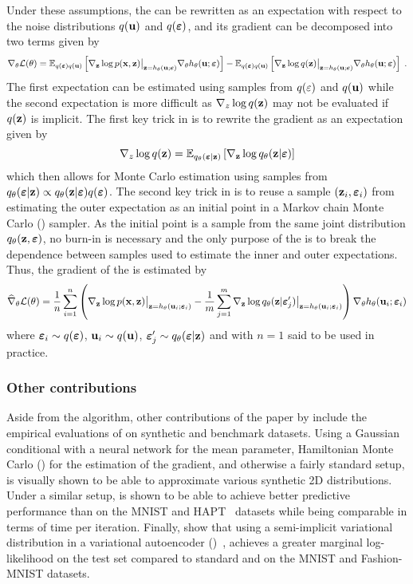 \documentclass[10pt]{article}
\begin{document}
Under these assumptions, the \elbo can be rewritten as an expectation with respect to the noise distributions $q(\mathbf{u})$ and $q(\bm{\varepsilon})$, and its gradient can be decomposed into two terms given by
\[
\nabla_\theta \mathcal{L}(\theta) = \mathbb{E}_{q(\bm{\varepsilon})q(\mathbf{u})}\left[\nabla_{\mathbf{z}} \log p(\mathbf{x},\mathbf{z})\big|_{\mathbf{z}=h_\theta(\mathbf{u};\bm{\varepsilon})}\nabla_\theta h_\theta(\mathbf{u};\bm{\varepsilon})\right] - \mathbb{E}_{q(\bm{\varepsilon})q(\mathbf{u})}\left[\nabla_{\mathbf{z}} \log q(\mathbf{z})\big|_{\mathbf{z}=h_\theta(\mathbf{u};\bm{\varepsilon})}\nabla_\theta h_\theta(\mathbf{u};\bm{\varepsilon})\right] \;.
\]
The first expectation can be estimated using samples from $q(\bf\varepsilon)$ and $q(\mathbf{u})$ while the second expectation is more difficult as $\nabla_z\log q(\mathbf{z})$ may not be evaluated if $q(\mathbf{z})$ is implicit. The first key trick in \uivi is to rewrite the gradient as an expectation given by
\[
\nabla_z\log q(\mathbf{z}) = \mathbb{E}_{q_\theta(\bm{\varepsilon}|\mathbf{z})}\left[\nabla_{\mathbf{z}}\log q_\theta(\mathbf{z}|\bm{\varepsilon})\right]
\]
which then allows for Monte Carlo estimation using samples from $q_\theta(\bm{\varepsilon}|\mathbf{z})\propto q_\theta(\mathbf{z}|\bm{\varepsilon})q(\bm{\varepsilon})$. The second key trick in \uivi is to reuse a sample $(\mathbf{z}_i,\bm{\varepsilon}_i)$ from estimating the outer expectation as an initial point in a Markov chain Monte Carlo (\mcmc) sampler. As the initial point is a sample from the same joint distribution $q_\theta(\mathbf{z},\bm{\varepsilon})$, no burn-in is necessary and the only purpose of the \mcmc is to break the dependence between samples used to estimate the inner and outer expectations. Thus, the gradient of the \elbo is estimated by
\[
\widehat{\nabla}_\theta\mathcal{L}(\theta) = \frac{1}{n}\sum_{i=1}^n \left(\nabla_{\mathbf{z}}\log p(\mathbf{x},\mathbf{z})\big|_{\mathbf{z}=h_\theta(\mathbf{u}_i;\bm{\varepsilon}_i)} - \frac{1}{m}\sum_{j=1}^m \nabla_{\mathbf{z}}\log q_\theta(\mathbf{z}|\bm{\varepsilon}_j')\big|_{\mathbf{z}=h_\theta(\mathbf{u}_i;\bm{\varepsilon}_i)} \right)\nabla_\theta h_\theta(\mathbf{u}_i;\bm{\varepsilon}_i)
\]
where $\bm{\varepsilon}_i\sim q(\bm{\varepsilon})$, $\mathbf{u}_i\sim q(\mathbf{u})$, $\bm{\varepsilon}_j'\sim q_\theta(\bm{\varepsilon}|\mathbf{z})$ and with $n=1$ said to be used in practice.

\subsubsection{Other contributions}

Aside from the \uivi algorithm, other contributions of the paper by \citet{Titsias:2019} include the empirical evaluations of \uivi on synthetic and benchmark datasets. Using a Gaussian conditional with a neural network for the mean parameter, Hamiltonian Monte Carlo (\hmc) for the \mcmc estimation of the \elbo gradient, and otherwise a fairly standard setup, \uivi is visually shown to be able to approximate various synthetic 2D distributions. Under a similar setup, \uivi is shown to be able to achieve better predictive performance than \sivi on the MNIST and HAPT~\citep{Reyes:2014} datasets while being comparable in terms of time per iteration. Finally, \citet{Titsias:2019} show that using a semi-implicit variational distribution in a variational autoencoder (\vae)~\citep{Kingma:2013}, \uivi achieves a greater marginal log-likelihood on the test set compared to standard \vae and \sivi on the MNIST and Fashion-MNIST datasets.
\end{document}
